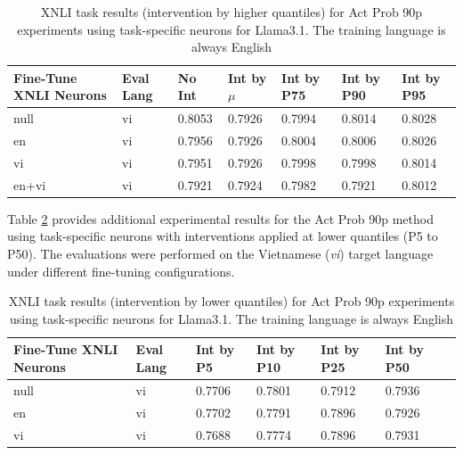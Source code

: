 \begin{table}[ht]
	\centering
	\renewcommand{\arraystretch}{1.3}
	\setlength{\tabcolsep}{4pt}
	\begin{tabularx}{\textwidth}{|X|X|X|X|X|X|X|}
		\hline
		\textbf{Fine-Tune XNLI Neurons} & \textbf{Eval Lang} & \textbf{No Int} & \textbf{Int by $\mu$} & \textbf{Int by P75} & \textbf{Int by P90} & \textbf{Int by P95} \\
		\hline
		null & vi & 0.8053 & 0.7926 & 0.7994 & 0.8014 & 0.8028 \\
		en & vi & 0.7956 & 0.7926 & 0.8004 & 0.8006 & 0.8026 \\
		vi & vi & 0.7951 & 0.7926 & 0.7998 & 0.7998 & 0.8014 \\
		en+vi & vi & 0.7921 & 0.7924 & 0.7982 & 0.7921 & 0.8012 \\
		\hline
	\end{tabularx}
	\caption{XNLI task results (intervention by higher quantiles) for Act Prob 90p experiments using task-specific neurons for Llama3.1. The training language is always English}
	\label{tab:task_specific_results_90p}
\end{table}

Table \ref{tab:task_specific_results_p5_p50} provides additional experimental results for the Act Prob 90p method using task-specific neurons with interventions applied at lower quantiles (P5 to P50). The evaluations were performed on the Vietnamese (\textit{vi}) target language under different fine-tuning configurations.

\begin{table}[ht]
	\centering
	\renewcommand{\arraystretch}{1.3}
	\setlength{\tabcolsep}{4pt}
	\begin{tabularx}{\textwidth}{|X|X|X|X|X|X|X|}
		\hline
		\textbf{Fine-Tune XNLI Neurons} & \textbf{Eval Lang} & \textbf{Int by P5} & \textbf{Int by P10} & \textbf{Int by P25} & \textbf{Int by P50} \\
		\hline
		null & vi & 0.7706 & 0.7801 & 0.7912 & 0.7936 \\
		en & vi & 0.7702 & 0.7791 & 0.7896 & 0.7926 \\
		vi & vi & 0.7688 & 0.7774 & 0.7896 & 0.7931 \\
		\hline
	\end{tabularx}
	\caption{XNLI task results (intervention by lower quantiles) for Act Prob 90p experiments using task-specific neurons for Llama3.1. The training language is always English}
	\label{tab:task_specific_results_p5_p50}
\end{table}














